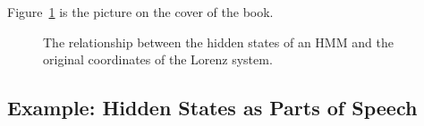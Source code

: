 \documentclass[prelim,showlabels]{book}
\begin{document}
 Figure~\ref{fig:Statesintro} is the picture on the cover of the book.
 \begin{figure}[htb]
   \caption[Relationship between states of HMM and Lorenz system.]%
   {The relationship between the hidden states of an HMM and the
     original coordinates of the Lorenz system.}
   \label{fig:Statesintro}
 \end{figure}

\subsection{Example: Hidden States as Parts of Speech}
\label{sec:POSpeech}
\end{document}
